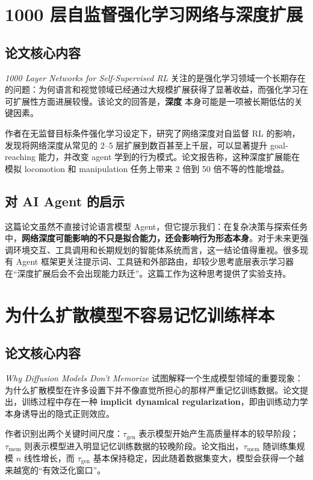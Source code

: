 \documentclass[UTF8,11pt]{ctexart}
\begin{document}
\section{1000 层自监督强化学习网络与深度扩展}
\subsection{论文核心内容}
\emph{1000 Layer Networks for Self-Supervised RL} 关注的是强化学习领域一个长期存在的问题：为何语言和视觉领域已经通过大规模扩展获得了显著收益，而强化学习在可扩展性方面进展较慢。该论文的回答是，\textbf{深度} 本身可能是一项被长期低估的关键因素。

作者在无监督目标条件强化学习设定下，研究了网络深度对自监督 RL 的影响，发现将网络深度从常见的 2--5 层扩展到数百甚至上千层，可以显著提升 goal-reaching 能力，并改变 agent 学到的行为模式。论文报告称，这种深度扩展能在模拟 locomotion 和 manipulation 任务上带来 2 倍到 50 倍不等的性能增益。

\subsection{对 AI Agent 的启示}
这篇论文虽然不直接讨论语言模型 Agent，但它提示我们：在复杂决策与探索任务中，\textbf{网络深度可能影响的不只是拟合能力，还会影响行为形态本身}。对于未来更强调环境交互、工具调用和长期规划的智能体系统而言，这一结论值得重视。很多现有 Agent 框架更关注提示词、工具链和外部路由，却较少思考底层表示学习器在“深度扩展后会不会出现能力跃迁”。这篇工作为这种思考提供了实验支持。

\section{为什么扩散模型不容易记忆训练样本}
\subsection{论文核心内容}
\emph{Why Diffusion Models Don't Memorize} 试图解释一个生成模型领域的重要现象：为什么扩散模型在许多设置下并不像直觉所担心的那样严重记忆训练数据。论文提出，训练过程中存在一种 \textbf{implicit dynamical regularization}，即由训练动力学本身诱导出的隐式正则效应。

作者识别出两个关键时间尺度：$\tau_{\mathrm{gen}}$ 表示模型开始产生高质量样本的较早阶段；$\tau_{\mathrm{mem}}$ 则表示模型进入明显记忆训练数据的较晚阶段。论文指出，$\tau_{\mathrm{mem}}$ 随训练集规模 $n$ 线性增长，而 $\tau_{\mathrm{gen}}$ 基本保持稳定，因此随着数据集变大，模型会获得一个越来越宽的“有效泛化窗口”。
\end{document}
